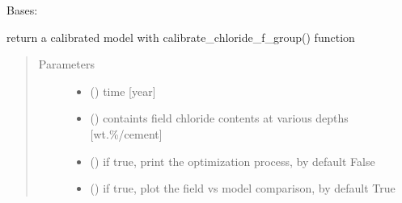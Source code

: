 \documentclass[letterpaper,10pt,english]{sphinxmanual}
\begin{document}
\begin{fulllineitems}
\label{\detokenize{chloride:chloride.Chloride_Model}}
\sphinxAtStartPar
Bases: 

\begin{fulllineitems}
\label{\detokenize{chloride:chloride.Chloride_Model.calibrate}}
\sphinxAtStartPar
return a calibrated model with calibrate\_chloride\_f\_group() function
\begin{quote}\begin{description}
\item[{Parameters}] \leavevmode\begin{itemize}
\item {} 
\sphinxAtStartPar
{} (\sphinxstyleliteralemphasis{\sphinxupquote{, }}) \textendash{} time {[}year{]}

\item {} 
\sphinxAtStartPar
{} () \textendash{} containts field chloride contents at various depths {[}wt.\sphinxhyphen{}\%/cement{]}

\item {} 
\sphinxAtStartPar
{} (\sphinxstyleliteralemphasis{\sphinxupquote{, }}) \textendash{} if true, print the optimization process, by default False

\item {} 
\sphinxAtStartPar
{} (\sphinxstyleliteralemphasis{\sphinxupquote{, }}) \textendash{} if true, plot the field vs model comparison, by default True


\end{itemize}
\end{description}
\end{quote}
\end{fulllineitems}
\end{fulllineitems}
\end{document}
